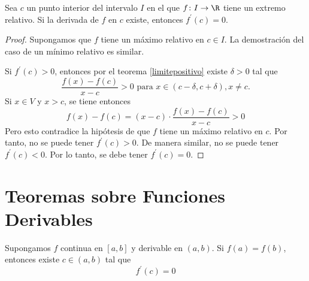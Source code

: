 \begin{theorem}
	\label{extrint}
	Sea \(c \) un punto interior del intervalo \(I \) en el que \(f \colon I \to \R \) tiene un extremo relativo. Si la derivada de \(f \) en \(c \) existe, entonces \(f^\prime (c) = 0\).  
\end{theorem}
\begin{proof}
	Supongamos que \(f \) tiene un máximo relativo en \(c \in I\). La demostración del caso de un mínimo relativo es similar. 
	
	Si \(f^\prime (c) > 0\), entonces por el teorema \ref{limitepositivo} existe \(\delta > 0 \) tal que
	\[
		\frac{f(x) - f(c)}{x - c} > 0 \text{ para } x \in (c - \delta, c + \delta), x \neq c. 
	\]
	Si \(x \in V\) y \(x > c \), se tiene entonces 
	\[
		f(x) - f(c) = (x - c ) \cdot \frac{f(x) - f(c )}{x - c } > 0 
	\]
	Pero esto contradice la hipótesis de que \(f \) tiene un máximo relativo en \(c \). Por tanto, no se puede tener \(f^\prime (c) > 0\). De manera similar, no se puede tener \(f^\prime (c) <0 \). Por lo tanto, se debe tener \(f^\prime (c) = 0\).   
\end{proof}

\section{Teoremas sobre Funciones Derivables}
\begin{theorem}[de Rolle]
	Supongamos \(f \) continua en \([a,b ]\) y derivable en \((a,b )\). Si \(f(a) = f(b )\), entonces existe \(c \in (a,b )\) tal que
	\[
		f^\prime (c) = 0
	\]
\end{theorem}

